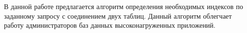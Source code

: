 \Conclusion

В данной работе предлагается алгоритм определения необходимых индексов по заданному запросу с соединением двух таблиц. Данный алгоритм облегчает работу администраторов баз данных высоконагруженных приложений.